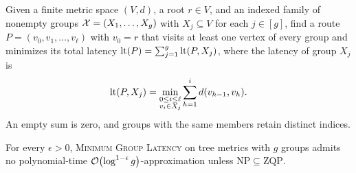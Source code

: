 \begin{problem} \label{problem:MGL}
Given a finite metric space $(V,d)$, a root $r\in V$, and an indexed family of nonempty groups $\mathcal{X}=(X_1,\ldots,X_g)$ with $X_j\subseteq V$ for each $j\in[g]$, find a route $P=(v_0,v_1,\ldots,v_\ell)$ with $v_0=r$ that visits at least one vertex of every group and minimizes its total latency $\operatorname{lt}\mathopen{}\left( P \right)=\sum_{j=1}^{g}\operatorname{lt}\mathopen{}\left( P,X_j \right)$, where the latency of group $X_j$ is
\[
    \operatorname{lt}\mathopen{}\left( P,X_j \right)=\min_{\substack{0\leq i\leq\ell\\v_i\in X_j}}\sum_{h=1}^{i}d(v_{h-1},v_h).
\]
An empty sum is zero, and groups with the same members retain distinct indices.
\end{problem}

\begin{theorem}\label{thm:source-MGL-hardness}
    \setlength{\emergencystretch}{2em}
    For every $\epsilon>0$, \textup{\textsc{Minimum Group Latency}} on tree metrics with $g$ groups admits no polynomial-time $\mathcal{O}\mathopen{}\left( \log^{1-\epsilon}g \right)$-approximation unless $\mathrm{NP}\subseteq\mathrm{ZQP}$.
\end{theorem}

